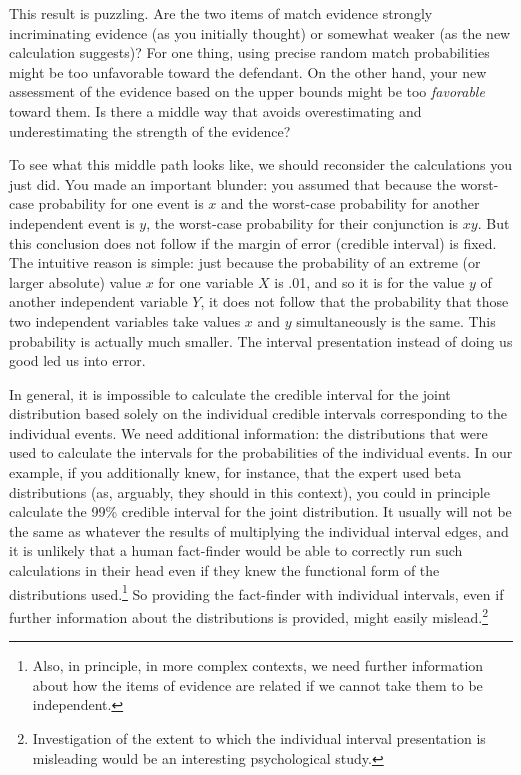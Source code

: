 \documentclass[
  10pt,
  dvipsnames,enabledeprecatedfontcommands]{scrartcl}
\begin{document}
This result is puzzling. Are the two items of match evidence strongly
incriminating evidence (as you initially thought) or somewhat weaker (as
the new calculation suggests)? For one thing, using precise random match
probabilities might be too unfavorable toward the defendant. On the
other hand, your new assessment of the evidence based on the upper
bounds might be too \emph{favorable} toward them. Is there a middle way
that avoids overestimating and underestimating the strength of the
evidence?

To see what this middle path looks like, we should reconsider the
calculations you just did. You made an important blunder: you assumed
that because the worst-case probability for one event is \(x\) and the
worst-case probability for another independent event is \(y\), the
worst-case probability for their conjunction is \(xy\). But this
conclusion does not follow if the margin of error (credible interval) is
fixed. The intuitive reason is simple: just because the probability of
an extreme (or larger absolute) value \(x\) for one variable \(X\) is
.01, and so it is for the value \(y\) of another independent variable
\(Y\), it does not follow that the probability that those two
independent variables take values \(x\) and \(y\) simultaneously is the
same. This probability is actually much smaller. The interval
presentation instead of doing us good led us into error.

In general, it is impossible to calculate the credible interval for the
joint distribution based solely on the individual credible intervals
corresponding to the individual events. We need additional information:
the distributions that were used to calculate the intervals for the
probabilities of the individual events. In our example, if you
additionally knew, for instance, that the expert used beta distributions
(as, arguably, they should in this context), you could in principle
calculate the 99\% credible interval for the joint distribution. It
usually will not be the same as whatever the results of multiplying the
individual interval edges, and it is unlikely that a human fact-finder
would be able to correctly run such calculations in their head even if
they knew the functional form of the distributions used.\footnote{Also,
  in principle, in more complex contexts, we need further information
  about how the items of evidence are related if we cannot take them to
  be independent.} So providing the fact-finder with individual
intervals, even if further information about the distributions is
provided, might easily mislead.\footnote{Investigation of the extent to
  which the individual interval presentation is misleading would be an
  interesting psychological study.}
\end{document}
